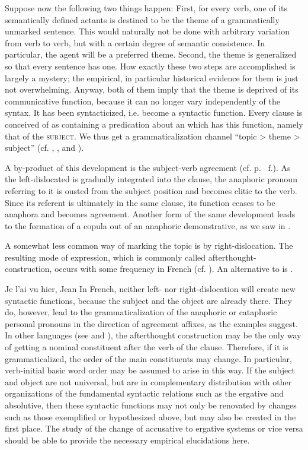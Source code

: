 Suppose now the following two things happen: First, for every verb, one of its semantically defined actants is destined to be the theme of a grammatically unmarked sentence. This would naturally not be done with arbitrary variation from verb to verb, but with a certain degree of semantic consistence. In particular, the agent will be a preferred theme. Second, the theme is generalized so that every sentence has one. How exactly these two steps are accomplished is largely a mystery; the empirical, in particular historical evidence for them is just not overwhelming. Anyway, both of them imply that the theme is deprived of its communicative function, because it can no longer vary independently of the syntax. It has been syntacticized, i.e. become a syntactic function. Every clause is conceived of as containing a predication about an \np which has this function, namely that of the \textsc{subject}. We thus get a grammaticalization channel ``topic {\textgreater} theme {\textgreater} subject'' (cf. \citealt[484]{LiEtAl1976}, \citealt[83--85]{Givón1979}, \citealt[114]{Comrie1981b} and \citealt[99--101]{MallinsonEtAl1981}).

A by-product of this development is the subject-verb agreement (cf. p.~\pageref{page44}%
f.). As the left-dislocated \np is gradually integrated into the clause, the anaphoric pronoun referring to it is ousted from the subject position and becomes clitic to the verb. Since its referent is ultimately in the same clause, its function ceases to be anaphora and becomes agreement. Another form of the same development leads to the formation of a copula out of an anaphoric demonstrative, as we saw in .

A somewhat less common way of marking the topic is by right-dislocation. The resulting mode of expression, which is commonly called afterthought-\linebreak construction, occurs with some frequency in French (cf. \citealt[402, 427]{MallinsonEtAl1981}). An alternative to  is .

\ea \label{ex:E94}
  Je l'ai vu hier, Jean
  \z
\noindent In French, neither left- nor right-dislocation will create new syntactic functions, because the subject and the object are already there. They do, however, lead to the grammaticalization of the anaphoric or cataphoric personal pronouns in the direction of agreement affixes, as the examples suggest. In other languages (see \citealt[119--121]{Hyman1975} and \citealt[170]{Vincent1980a}), the afterthought construction may be the only way of getting a nominal constituent after the verb of the clause. Therefore, if it is grammaticalized, the order of the main constituents may change. In particular, verb-initial basic word order may be assumed to arise in this way. If the subject and object are not universal, but are in complementary distribution with other organizations of the fundamental syntactic relations such as the ergative and absolutive, then these syntactic functions may not only be renovated by changes such as those exemplified or hypothesized above, but may also be created in the first place. The study of the change of accusative to ergative systems or vice versa should be able to provide the necessary empirical elucidations here.

